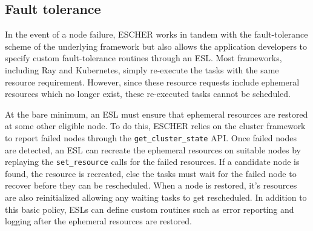 

\subsection{Fault tolerance}
\label{sec:esl-faulttol}
In the event of a node failure, ESCHER works in tandem with the fault-tolerance scheme of the underlying framework but also allows the application developers to specify custom fault-tolerance routines through an ESL. Most frameworks, including Ray\cite{ray} and Kubernetes\cite{kubernetes}, simply re-execute the tasks with the same resource requirement. However, since these resource requests include ephemeral resources which no longer exist, these re-executed tasks cannot be scheduled.

At the bare minimum, an ESL must ensure that ephemeral resources are restored at some other eligible node. To do this, ESCHER relies on the cluster framework to report failed nodes through the \lstinline{get_cluster_state} API. Once failed nodes are detected, an ESL can recreate the ephemeral resources on suitable nodes by replaying the \lstinline{set_resource} calls for the failed resources. If a candidate node is found, the resource is recreated, else the tasks must wait for the failed node to recover before they can be rescheduled. When a node is restored, it's resources are also reinitialized allowing any waiting tasks to get rescheduled. In addition to this basic policy, ESLs can define custom routines such as error reporting and logging after the ephemeral resources are restored.
